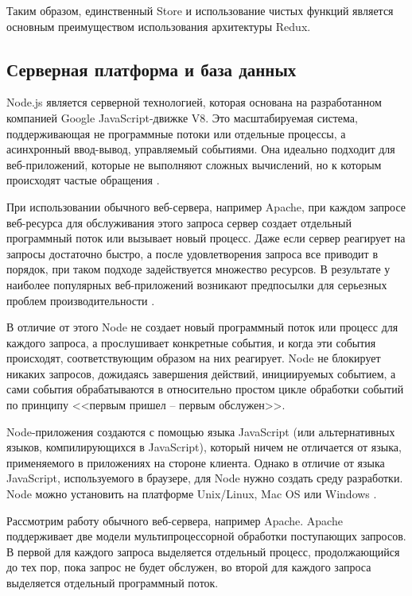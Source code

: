 Таким образом, единственный Store и использование чистых функций является основным преимуществом использования архитектуры Redux.


\subsection{Серверная платформа и база данных}
\label{sub:domain:mdl_principle}
Node.js является серверной технологией, которая основана на разработанном компанией Google JavaScript-движке V8. Это масштабируемая система, поддерживающая не программные потоки или отдельные процессы, а асинхронный ввод-вывод, управляемый событиями. Она идеально подходит для веб-приложений, которые не выполняют сложных вычислений, но к которым происходят частые обращения \cite{node_js}.

При использовании обычного веб-сервера, например Apache, при каждом запросе веб-ресурса для обслуживания этого запроса сервер создает отдельный программный поток или вызывает новый процесс. Даже если сервер реагирует на запросы достаточно быстро, а после удовлетворения запроса все приводит в порядок, при таком подходе задействуется множество ресурсов. В результате у наиболее популярных веб-приложений возникают предпосылки для серьезных проблем производительности \cite{apache}.

В отличие от этого Node не создает новый программный поток или процесс для каждого запроса, а прослушивает конкретные события, и когда эти события происходят, соответствующим образом на них реагирует. Node не блокирует никаких запросов, дожидаясь завершения действий, инициируемых событием, а сами события обрабатываются в относительно простом цикле обработки событий по принципу <<первым пришел -- первым обслужен>>.

Node-приложения создаются с помощью языка JavaScript (или альтернативных языков, компилирующихся в JavaScript), который ничем не отличается от языка, применяемого в приложениях на стороне клиента. Однако в отличие от языка JavaScript, используемого в браузере, для Node нужно создать среду разработки. Node можно установить на платформе Unix/Linux, Mac OS или Windows \cite{js}.

Рассмотрим работу обычного веб-сервера, например Apache. Apache поддерживает две модели мультипроцессорной обработки поступающих запросов. В первой для каждого запроса выделяется отдельный процесс, продолжающийся до тех пор, пока запрос не будет обслужен, во второй для каждого запроса выделяется отдельный программный поток.

